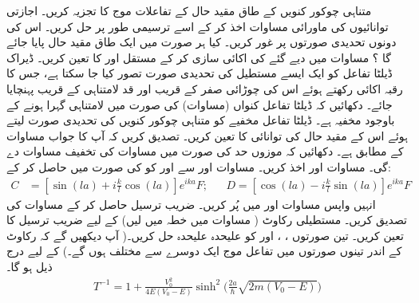  
متناہی چوکور کنویں کے طاق مقید حال کے تفاعلات  موج کا تجزیہ کریں۔ اجازتی توانائیوں کی ماورائی مساوات اخذ کر کے اسے ترسیمی طور پر حل کریں۔ اس کی دونوں تحدیدی صورتوں پر غور کریں۔ کیا ہر صورت میں  ایک طاق مقید حال پایا جائے گا ؟ 
 مساوات میں دیے گئے  کی اکائی سازی کر کے مستقل اور کا  تعین کریں۔
ڈیراک ڈیلٹا تفاعل کو ایک ایسے مستطیل کی تحدیدی صورت تصور کیا جا سکتا ہے، جس کا رقبہ اکائی   رکھتے ہوئے اس کی چوڑائی صفر کے قریب  اور قد لامتناہی  کے قریب پہنچایا جائے۔ دکھائیں کہ ڈیلٹا تفاعل کنواں (مساوات)  کی صورت میں لامتناہی گہرا ہونے کے باوجود    مخفیہ ہے۔ ڈیلٹا تفاعل مخفیے  کو متناہی چوکور کنویں کی تحدیدی صورت لیتے ہوئے اس کے  مقید حال کی توانائی  کا تعین کریں۔ تصدیق کریں کہ آپ کا جواب مساوات کے مطابق ہے۔ دکھائیں کہ موزوں حد کی صورت میں مساوات کی تخفیف مساوات دے گی۔
مساوات  اور   اخذ کریں۔ مساوات  اور سے  اور  کو  کی صورت میں حاصل کر کے:
\begin{align*}
C&=[\sin(la)+i\frac{k}{l}\cos(la)]e^{ika}F; && D=[\cos(la)-i\frac{k}{l}\sin(la)]e^{ika}F
 \end{align*}
 انہیں واپس مساوات  اور  میں پُر کریں۔ ضریب ترسیل حاصل کر کے مساوات  کی تصدیق کریں۔
مستطیلی رکاوٹ ( مساوات  میں   خطہ میں لیں) کے لیے ضریب ترسیل کا  تعین کریں۔ تین صورتوں ،
، اور  کو علیحدہ علیحدہ حل کریں۔( آپ دیکھیں گے کہ رکاوٹ کے اندر تینوں صورتوں میں تفاعل موج ایک دوسرے سے مختلف ہوں گے۔)   کے لیے درج ذیل ہو گا۔
\begin{align*}
T^{-1}=1+\frac{V_{0}^2}{4E(V_{0}-E)}\sinh^{2}\Big(\frac{2a}{\hslash}\sqrt{2m(V_{0}-E)} \Big) 
\end{align*}

